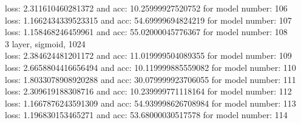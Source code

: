 \documentclass{article}
\begin{document}
loss: 2.311610460281372 and acc: 10.25999927520752 for model number: 106 \\
loss: 1.1662434339523315 and acc: 54.69999694824219 for model number: 107 \\
loss: 1.158468246459961 and acc: 55.02000045776367 for model number: 108 \\
3 layer, sigmoid, 1024 \\
loss: 2.384624481201172 and acc: 11.019999504089355 for model number: 109 \\
loss: 2.6658804416656494 and acc: 10.119999885559082 for model number: 110 \\
loss: 1.8033078908920288 and acc: 30.079999923706055 for model number: 111 \\
loss: 2.309619188308716 and acc: 10.239999771118164 for model number: 112 \\
loss: 1.1667876243591309 and acc: 54.939998626708984 for model number: 113 \\
loss: 1.196830153465271 and acc: 53.68000030517578 for model number: 114 \\
\end{document}
